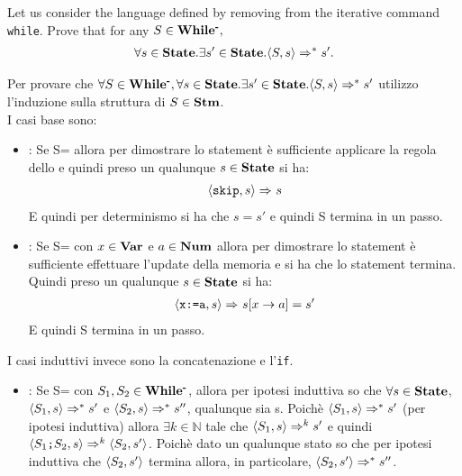 \newcommand{\whilem}{\syntacticCategory{While\textsuperscript{-}}}
\newcommand{\exOne}{$\forall{}S\in\whilem,\forall{}s\in\states.\exists s'\in\states.\confSs{S}{s}\Rar{*}s'$}

{
	Let us consider the language \whilem{} defined by removing from \while{}
	the iterative command \texttt{while}.  Prove that for any 
	$S\in\whilem,$
	\begin{align*}
	\forall{}s\in\mbox{\textbf{State}}.\exists s'\in\mbox{\textbf{State}}.\langle{}S, s\rangle{}\Rightarrow^{*}s'.
	\end{align*}
}
{
	Per provare che \exOne{} utilizzo l'induzione sulla struttura di $S\in\mbox{\textbf{Stm}}$.
	\\I casi base sono:
	
	\begin{itemize}
	
	\item {}: Se S=\skipistr{} allora per dimostrare lo
	statement è sufficiente applicare la regola dello \skipSOS{} e quindi preso
	un qualunque $s\in\mbox{\textbf{State}}$ si ha:
	\begin{align*}
	\langle{}\textrm{\normalfont{\texttt{skip}}}, s\rangle{}\Rightarrow^{}s
	\end{align*}
	E quindi per determinismo si ha che $s=s'$ e quindi S termina in un passo.

	\item {}: Se S= con $x\in\mbox{\textbf{Var}}$
	e $a\in\mbox{\textbf{Num}}$ allora per dimostrare lo statement è sufficiente effettuare
	l'update della memoria e si ha che lo statement termina. Quindi preso un
	qualunque $s\in\mbox{\textbf{State}}$ si ha:
	\begin{align*}
	\langle{}\textrm{\normalfont{\texttt{x:=a}}}, s\rangle{}\Rightarrow^{}s[x\rightarrow{}a]=s'
	\end{align*}
	E quindi S termina in un passo.
	
	\end{itemize}
	

	I casi induttivi invece sono la concatenazione e l'\texttt{if}.
	\begin{itemize}

	\item {}: Se S=
	con $S_1,S_2\in\whilem$, allora per ipotesi induttiva so che 
	$\forall{}s\in\mbox{\textbf{State}}$, $\langle{}S_1, s\rangle{}\Rightarrow^{*}s'$ e 
	$\langle{}S_2, s\rangle{}\Rightarrow^{*}s''$, qualunque sia s. Poichè 
	$\langle{}S_1, s\rangle{}\Rightarrow^{*}s'$ (per ipotesi induttiva) allora 
	$\exists{}k\in\mathbb{N}$ tale che $\langle{}S_1, s\rangle{}\Rightarrow^{k}s'$ e quindi
	$\langle{}\textrm{\normalfont{\texttt{$S_1$;$S_2$}}}, s\rangle{}\Rightarrow^{k}\langle{}S_2, s'\rangle{}$. Poichè
	dato un qualunque stato so che per ipotesi induttiva che $\langle{}S_2, s'\rangle{}$
	termina allora, in particolare, $\langle{}S_2, s'\rangle{}\Rightarrow^{*}s''$.


\end{itemize}}
